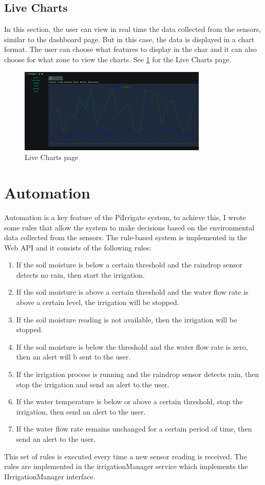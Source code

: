 \subsection{Live Charts}
In this section, the user can view in real time the data collected from the sensors, similar to the dashboard page. But in this case, the data is 
displayed in a chart format. The user can choose what features to display in the char and it can also choose for what zone to view the charts.
See \ref{fig:live-charts-page} for the Live Charts page.
\begin{figure}[H]
    \centering
    \includegraphics[width=0.8\textwidth]{images/live-charts.png}
    \caption{Live Charts page}
    \label{fig:live-charts-page}
\end{figure}


\section{Automation}
Automation is a key feature of the PiIrrigate system,
to achieve this, I wrote some rules that allow the system
to make decisions based on the environmental data collected from the sensors.
The rule-based system is implemented in the Web API and it consists
of the following rules:
\begin{enumerate}
    \item If the soil moisture is below a certain threshold and the raindrop sensor detects no rain, then start the irrigation.
    \item If the soil moisture is above a certain threshold and the water flow rate is above a certain level, the irrigation will be stopped.
    \item If the soil moisture reading is not available, then the irrigation will be stopped.
    \item If the soil moisture is below the threshold and the water flow rate is zero, then an alert will b sent to the user.
    \item If the irrigation process is running and the raindrop sensor detects rain, then stop the irrigation and send an alert to the user.
    \item If the water temperature is below or above a certain threshold, stop the irrigation, then send an alert to the user.
    \item If the water flow rate remains unchanged for a certain period of time, then send an alert to the user.
\end{enumerate}
This set of rules is executed every time a new sensor reading is received.
The rules are implemented in the irrigationManager service which implements the IIrrigationManager interface.                                                   

